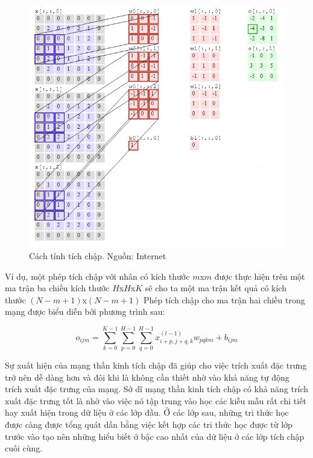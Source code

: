 \begin{figure}[H]
    \centering
    \includegraphics[width=15cm]{./content/materials/cnn.png}
    \caption{Cách tính tích chập. Nguồn: Internet}
\end{figure}

Ví dụ, một phép tích chập với nhân có kích thước $m$x$m$ được thực hiện trên một ma trận ba chiều kích thước $H$x$H$x$K$ sẽ cho ta một ma trận kết quả có kích thước $(N-m+1)$x$(N-m+1)$
Phép tích chập cho ma trận hai chiều trong mạng được biểu diễn bởi phương trình sau:

\begin{equation}
    o_{ijm}=\sum_{k=0}^{K-1}\sum_{p=0}^{H-1}\sum_{q=0}^{H-1}x_{i+p,j+q,k}^{(l-1)}w_{pqkm}+b_{ijm}
\end{equation}

Sự xuất hiện của mạng thần kinh tích chập đã giúp cho việc trích xuất đặc trưng trở nên dễ dàng hơn và đôi khi là không cần thiết nhờ vào khả năng tự động trích xuất đặc trưng của mạng. Sở dĩ mạng thần kinh tích chập có khả năng trích xuất đặc trưng tốt là nhờ vào việc nó tập trung vào học các kiễu mẫu rất chi tiết hay xuất hiện trong dữ liệu ở các lớp đầu. Ở các lớp sau, những tri thức học được càng được tổng quát dần bằng việc kết hợp các tri thức học được từ lớp trước vào tạo nên những hiểu biết ở bậc cao nhất của dữ liệu ở các lớp tích chập cuối cùng.

